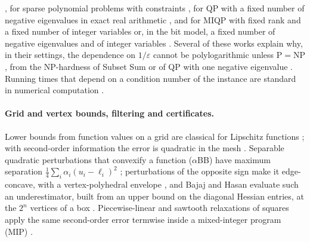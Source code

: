 \cite{DeLoeraEtAl2008,HildebrandWeismantelZemmer2016}, for sparse polynomial
problems with constraints \cite[Theorem~4]{BienstockMunoz2018}, for QP with a
fixed number of negative eigenvalues in exact real arithmetic
\cite{Vavasis1992}, and for MIQP with fixed rank and a fixed number of
integer variables \cite{DelPia2023} or, in the bit model, a fixed number of
negative eigenvalues and of integer variables \cite{DelPia2026Jacobi}. Several of these works explain why, in their
settings, the dependence on $1/\varepsilon$ cannot be polylogarithmic unless
P${}={}$NP \cite{BienstockMunoz2018,Vavasis1992,DelPia2026Jacobi}, from the
NP-hardness of Subset Sum or of QP with one negative eigenvalue
\cite{PardalosVavasis1991}. Running times that depend on a condition number
of the instance are standard in numerical computation
\cite{BurgisserCucker2013}.

\paragraph{Grid and vertex bounds, filtering and certificates.}
Lower bounds from function values on a grid are classical for Lipschitz
functions \cite{Piyavskii1972,Shubert1972,Nesterov2004}; with second-order
information the error is quadratic in the mesh
\cite{BreimanCutler1993,DeKlerkLasserreLaurentSun2017}. Separable quadratic
perturbations that convexify a function ($\alpha$BB) have maximum separation
$\frac14\sum_i\alpha_i(u_i-\ell_i)^2$
\cite{MaranasFloudas1994,AndroulakisMaranasFloudas1995,AdjimanEtAl1998};
perturbations of the opposite sign make it edge-concave, with a
vertex-polyhedral envelope
\cite{Tardella2004,MeyerFloudas2005,Hasan2018,MisenerFloudas2012}, and Bajaj
and Hasan evaluate such an underestimator, built from an upper bound on the
diagonal Hessian entries, at the $2^n$ vertices of a box
\cite{BajajHasan2020}. Piecewise-linear and sawtooth relaxations of squares
apply the same second-order error termwise inside a mixed-integer program
(MIP) \cite{BeachHildebrandHuchette2022,BeachEtAl2024,DongLuo2018}.

